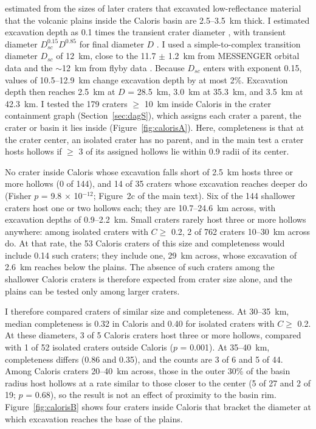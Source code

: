 \documentclass{planetary}
\begin{document}
\textcite{ernst2015} estimated from the sizes of later craters that excavated low-reflectance material that the volcanic plains inside the Caloris basin are 2.5--3.5~km thick. I estimated excavation depth as 0.1 times the transient crater diameter \parencite{melosh1989}, with transient diameter $D_{sc}^{0.15} D^{0.85}$ for final diameter $D$ \parencite{croft1985}. I used a simple-to-complex transition diameter $D_{sc}$ of 12~km, close to the 11.7 $\pm$ 1.2~km from MESSENGER orbital data \parencite{susorney2016} and the $\sim$12~km from flyby data \parencite{barnouin2012}. Because $D_{sc}$ enters with exponent 0.15, values of 10.5--12.9~km change excavation depth by at most 2\%. Excavation depth then reaches 2.5~km at $D$ = 28.5~km, 3.0~km at 35.3~km, and 3.5~km at 42.3~km. I tested the 179 craters $\geq$ 10~km inside Caloris in the crater containment graph (Section~\ref{sec:dagS}), which assigns each crater a parent, the crater or basin it lies inside (Figure~\ref{fig:calorisA}). Here, completeness is that at the crater center, an isolated crater has no parent, and in the main test a crater hosts hollows if $\geq$ 3 of its assigned hollows lie within 0.9 radii of its center.

No crater inside Caloris whose excavation falls short of 2.5~km hosts three or more hollows (0 of 144), and 14 of 35 craters whose excavation reaches deeper do (Fisher $p$ = 9.8 $\times$ 10$^{-12}$; Figure~2c of the main text). Six of the 144 shallower craters host one or two hollows each; they are 10.7--24.6~km across, with excavation depths of 0.9--2.2~km. Small craters rarely host three or more hollows anywhere: among isolated craters with $C \geq$ 0.2, 2 of 762 craters 10--30~km across do. At that rate, the 53 Caloris craters of this size and completeness would include 0.14 such craters; they include one, 29~km across, whose excavation of 2.6~km reaches below the plains. The absence of such craters among the shallower Caloris craters is therefore expected from crater size alone, and the plains can be tested only among larger craters.

I therefore compared craters of similar size and completeness. At 30--35~km, median completeness is 0.32 in Caloris and 0.40 for isolated craters with $C \geq$ 0.2. At these diameters, 3 of 5 Caloris craters host three or more hollows, compared with 1 of 52 isolated craters outside Caloris ($p$ = 0.001). At 35--40~km, completeness differs (0.86 and 0.35), and the counts are 3 of 6 and 5 of 44. Among Caloris craters 20--40~km across, those in the outer 30\% of the basin radius host hollows at a rate similar to those closer to the center (5 of 27 and 2 of 19; $p$ = 0.68), so the result is not an effect of proximity to the basin rim. Figure~\ref{fig:calorisB} shows four craters inside Caloris that bracket the diameter at which excavation reaches the base of the plains.
\end{document}
